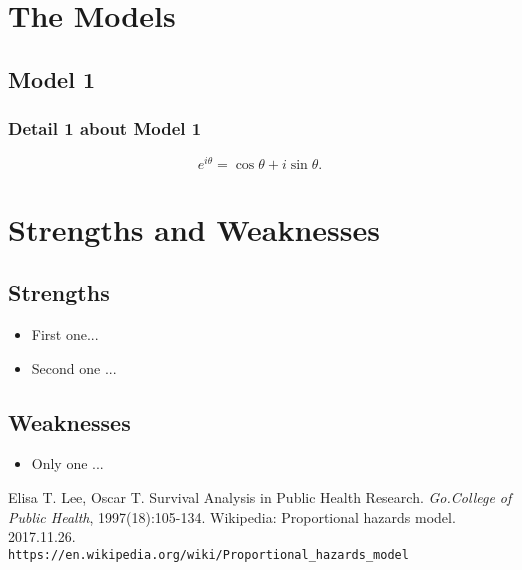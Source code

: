 \documentclass[12pt]{article}
\begin{document}
\section{The Models}
\subsection{Model 1}
\subsubsection{Detail 1 about Model 1}
\begin{equation}
    e^{i\theta}=\cos\theta+i\sin\theta.
\end{equation}

\section{Strengths and Weaknesses}
\subsection{Strengths}
\begin{itemize}
    \item First one...
    \item Second one ...
\end{itemize}

\subsection{Weaknesses}
\begin{itemize}
    \item Only one ...
 \end{itemize}

\begin{thebibliography}{99}
Elisa T. Lee, Oscar T. Survival Analysis in Public Health Research. \emph{Go.College of Public Health}, 1997(18):105-134.
Wikipedia: Proportional hazards model. 2017.11.26. \texttt{\\https://en.wikipedia.org/wiki/Proportional\_{}hazards\_{}model}
\end{thebibliography}
\end{document}
